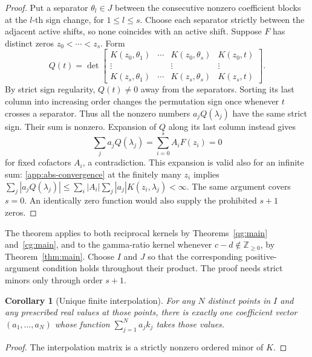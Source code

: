 \documentclass[11pt,a4paper]{article}
\newtheorem{corollary}[theorem]{Corollary}
\theoremstyle{definition}
\theoremstyle{remark}
\newcommand{\Z}{\mathbb Z}
\begin{document}
\begin{proof}
Put a separator \(\theta_l\in J\) between the consecutive nonzero
coefficient blocks at the \(l\)-th sign change, for \(1\le l\le s\).
Choose each separator strictly between the adjacent active shifts, so
none coincides with an active shift. Suppose \(F\) has distinct zeros
\(z_0<\cdots<z_s\). Form
\begin{equation}\label{app:separator}
 Q(t)=\det\begin{bmatrix}
 K(z_0,\theta_1)&\cdots&K(z_0,\theta_s)&K(z_0,t)\\
 \vdots&&\vdots&\vdots\\
 K(z_s,\theta_1)&\cdots&K(z_s,\theta_s)&K(z_s,t)
 \end{bmatrix}.
\end{equation}
By strict sign regularity, \(Q(t)\ne0\) away from the separators.
Sorting its last column into increasing order changes the permutation
sign once whenever \(t\) crosses a separator. Thus all the nonzero
numbers \(a_jQ(\lambda_j)\) have the same strict sign. Their sum is
nonzero. Expansion of \(Q\) along its last column instead gives
\[
 \sum_j a_jQ(\lambda_j)
 =\sum_{i=0}^s A_iF(z_i)=0
\]
for fixed cofactors \(A_i\), a contradiction. This expansion is valid
also for an infinite sum: \eqref{app:abs-convergence} at the finitely
many \(z_i\) implies
\(\sum_j|a_jQ(\lambda_j)|
 \le\sum_i|A_i|\sum_j|a_j|K(z_i,\lambda_j)<\infty\).
The same argument covers \(s=0\). An identically zero function would
also supply the prohibited \(s+1\) zeros.
\end{proof}

The theorem applies to both reciprocal kernels by
Theorems~\ref{qg:main} and~\ref{cg:main}, and to the gamma-ratio
kernel whenever \(c-d\notin\Z_{\ge0}\), by Theorem~\ref{thm:main}.
Choose \(I\) and \(J\) so that the corresponding positive-argument
condition holds throughout their product. The proof needs strict
minors only through order \(s+1\).

\begin{corollary}[Unique finite interpolation]\label{cor:interpolation}
For any \(N\) distinct points in \(I\) and any prescribed real
values at those points, there is exactly one coefficient vector
\((a_1,\ldots,a_N)\) whose function \(\sum_{j=1}^Na_jk_j\) takes
those values.
\end{corollary}
\begin{proof}
The interpolation matrix is a strictly nonzero ordered minor of \(K\).
\end{proof}
\end{document}
